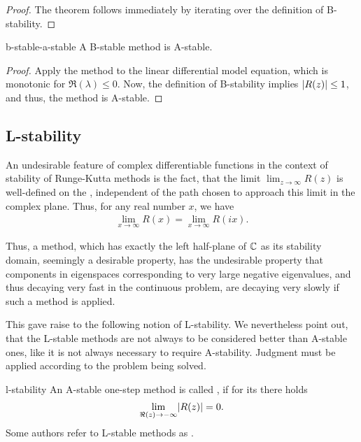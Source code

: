 \begin{proof}
  The theorem follows immediately by iterating over the definition of
  B-stability.
\end{proof}

\begin{Corollary}{b-stable-a-stable}
  A B-stable method is A-stable.
\end{Corollary}

\begin{proof}
  Apply the method to the linear differential model equation, which is
  monotonic for $\Re(\lambda) \le 0$. Now, the definition of B-stability
  implies $\lvert R(z)\rvert \le 1$, and thus, the method is A-stable.
\end{proof}

\subsection{L-stability}

An undesirable feature of complex differentiable functions in the
context of stability of Runge-Kutta methods is the fact, that the
limit $\lim_{z\to \infty} R(z)$ is well-defined on the ,
independent of the
path chosen to approach this limit in the complex plane. Thus, for any
real number $x$, we have
\begin{gather}
  \lim_{x\to\infty} R(x) = \lim_{x\to\infty} R(ix).
\end{gather}

Thus, a method, which has exactly the left half-plane of $\mathbb C$ as its
stability domain, seemingly a desirable property, has the undesirable
property that components in eigenspaces corresponding to very large
negative eigenvalues, and thus decaying very fast in the continuous
problem, are decaying very slowly if such a method is applied.

This gave raise to the following notion of L-stability. We
nevertheless point out, that the L-stable methods are not always to be
considered better than A-stable ones, like it is not always necessary
to require A-stability. Judgment must be applied according to the
problem being solved.

\begin{Definition}{l-stability}
  An A-stable one-step method is called , if for its
   there holds
  \begin{gather}
    \lim_{\Re (z) \to -\infty} \lvert R(z)\rvert = 0.
  \end{gather}
  Some authors refer to L-stable methods as .
\end{Definition}

